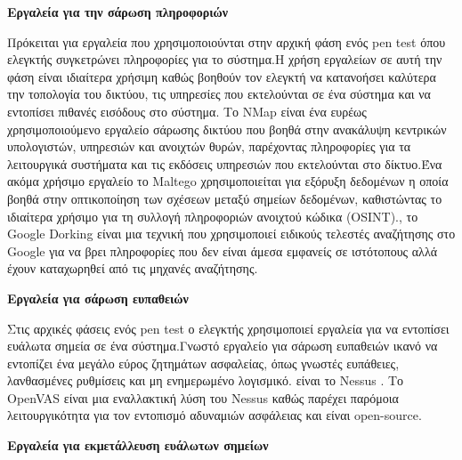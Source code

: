 \begin{center}
    \textbf{Εργαλεία για την σάρωση πληροφοριών}
\end{center}
    

    Πρόκειται για εργαλεία που χρησιμοποιούνται στην αρχική φάση ενός \lt pen test \gt όπου ελεγκτής συγκετρώνει πληροφορίες για το σύστημα.Η χρήση εργαλείων σε αυτή την φάση είναι ιδιαίτερα χρήσιμη καθώς βοηθούν τον ελεγκτή να κατανοήσει καλύτερα την τοπολογία του δικτύου, τις υπηρεσίες που εκτελούνται σε ένα σύστημα και να εντοπίσει πιθανές εισόδους στο σύστημα.
   Το \lt NMap \gt είναι ένα ευρέως χρησιμοποιούμενο εργαλείο σάρωσης δικτύου που βοηθά στην ανακάλυψη κεντρικών υπολογιστών, υπηρεσιών και ανοιχτών θυρών, παρέχοντας πληροφορίες για τα λειτουργικά συστήματα και τις εκδόσεις υπηρεσιών που εκτελούνται στο δίκτυο.Ένα ακόμα χρήσιμο εργαλείο το \lt Maltego \gt χρησιμοποιείται για  εξόρυξη δεδομένων η οποία βοηθά στην οπτικοποίηση των σχέσεων μεταξύ σημείων δεδομένων, καθιστώντας το ιδιαίτερα χρήσιμο για τη συλλογή πληροφοριών ανοιχτού κώδικα \lt (OSINT)., το \lt Google Dorking \gt είναι μια τεχνική που χρησιμοποιεί ειδικούς τελεστές αναζήτησης στο \lt Google \gt για να βρει πληροφορίες που δεν είναι άμεσα εμφανείς σε ιστότοπους αλλά έχουν καταχωρηθεί από τις μηχανές αναζήτησης.

\vspace{1em}
\begin{center}
   \textbf{Εργαλεία για σάρωση ευπαθειών}
\end{center}
    Στις αρχικές φάσεις ενός \lt pen test \gt ο ελεγκτής χρησιμοποιεί εργαλεία για να εντοπίσει ευάλωτα σημεία σε ένα σύστημα.Γνωστό εργαλείο για σάρωση ευπαθειών ικανό να εντοπίζει ένα μεγάλο εύρος ζητημάτων ασφαλείας, όπως γνωστές ευπάθειες, λανθασμένες ρυθμίσεις και μη ενημερωμένο λογισμικό. είναι το \lt Nessus \gt. Το \lt OpenVAS \gt είναι μια  εναλλακτική λύση του \lt Nessus \gt καθώς παρέχει παρόμοια λειτουργικότητα για τον εντοπισμό αδυναμιών ασφάλειας και είναι \lt open-source. 
\vspace{1em}
\begin{center}
    \textbf{Εργαλεία για εκμετάλλευση ευάλωτων σημείων}
\end{center}
    

